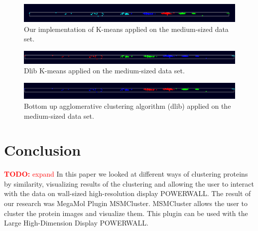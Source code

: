 \documentclass[journal]{vgtc}       %
\newcommand{\todo}[1]{\textcolor{red}{\textbf{TODO:} #1}}
\begin{document}


\begin{figure}[h!]
	\begin{center}
		\includegraphics[width=.75\linewidth]{k-Means-mediumDataSet.png}
	\end{center}
	\caption{\label{fig:kmeans} Our implementation of K-means applied on the medium-sized data set.}
\end{figure} 
\begin{figure}[h!]
	\begin{center}
		\includegraphics[width=.75\linewidth]{k-Means-dlib-mediumDataSet.png}
	\end{center}
	\caption{\label{fig:kmeans-dlib} Dlib K-means applied on the medium-sized data set.}
\end{figure}
\begin{figure}[h!]
	\begin{center}
		\includegraphics[width=.75\linewidth]{bottomUpAgglomerative-mediumDataSet.png}
	\end{center}
	\caption{\label{fig:bottomUpAgglomerative} Bottom up agglomerative clustering algorithm (dlib) applied on the medium-sized data set.}
\end{figure}


\section{Conclusion}
\todo{expand}
In this paper we looked at different ways of clustering proteins by similarity, visualizing results of the clustering and allowing the user to interact with the data on wall-sized high-resolution display POWERWALL. The result of our research was MegaMol Plugin MSMCluster. MSMCluster allows the user to cluster the protein images and visualize them. This plugin can be used with the Large High-Dimension Display POWERWALL. 
\end{document}
